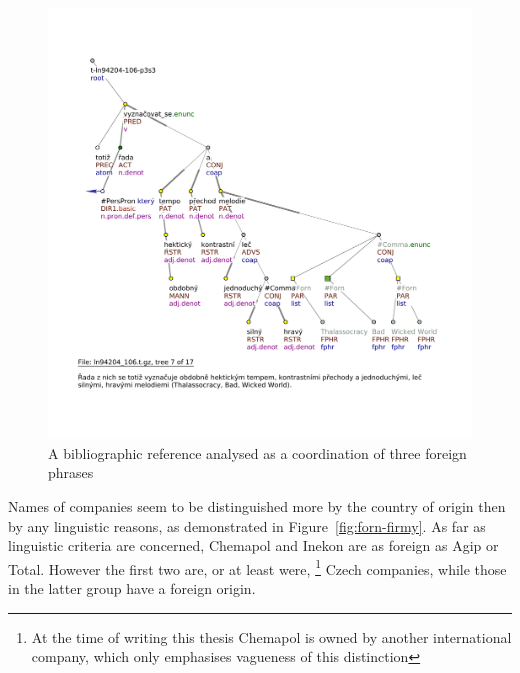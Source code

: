 \begin{figure}[h]
\includegraphics[width=\textwidth]{images/vyhledavky/forn-coord1x-biblio.pdf}
\caption{A bibliographic reference analysed as a coordination of three foreign phrases}
\label{fig:forn-biblio}
\end{figure}

Names of companies seem to be distinguished more by the country of origin then by any linguistic reasons, as demonstrated in Figure~\ref{fig:forn-firmy}. As far as linguistic criteria are concerned, Chemapol and Inekon are as foreign as Agip or Total. However the first two are, or at least were,%
\footnote{At the time of writing this thesis Chemapol is owned by another international company, which only emphasises vagueness of this distinction} %
%
Czech companies, while those in the latter group have a foreign origin.

